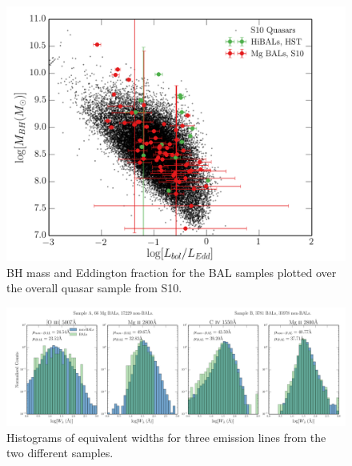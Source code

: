 
\begin{figure} %
\centering
\includegraphics[width=1.0\textwidth]{figures/ewpaper/bals_scatter.png}
\caption
{
BH mass and Eddington fraction for the BAL samples plotted 
over the overall quasar sample from S10.
}
\label{fig:bal_scatter}
\end{figure} %



\begin{figure} %
\centering
\includegraphics[width=1.0\textwidth]{figures/ewpaper/ew_hist_qsos.png}
\caption
{
Histograms of equivalent widths for three emission lines from the two different samples.
}
\label{fig:ew_hists}
\end{figure} %

